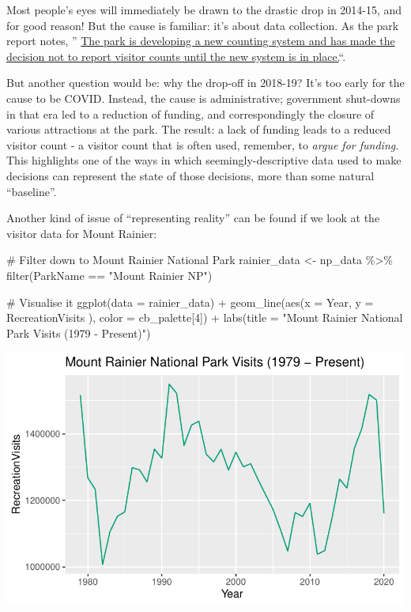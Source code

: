 \documentclass[
  letterpaper,
  DIV=11,
  numbers=noendperiod]{scrartcl}
\newenvironment{Shaded}{\begin{snugshade}}{\end{snugshade}}
\newcommand{\AttributeTok}[1]{\textcolor[rgb]{0.40,0.45,0.13}{#1}}
\newcommand{\CommentTok}[1]{\textcolor[rgb]{0.37,0.37,0.37}{#1}}
\newcommand{\DecValTok}[1]{\textcolor[rgb]{0.68,0.00,0.00}{#1}}
\newcommand{\FunctionTok}[1]{\textcolor[rgb]{0.28,0.35,0.67}{#1}}
\newcommand{\NormalTok}[1]{\textcolor[rgb]{0.00,0.23,0.31}{#1}}
\newcommand{\OtherTok}[1]{\textcolor[rgb]{0.00,0.23,0.31}{#1}}
\newcommand{\SpecialCharTok}[1]{\textcolor[rgb]{0.37,0.37,0.37}{#1}}
\newcommand{\StringTok}[1]{\textcolor[rgb]{0.13,0.47,0.30}{#1}}
\begin{document}
Most people's eyes will immediately be drawn to the drastic drop in
2014-15, and for good reason! But the cause is familiar: it's about data
collection. As the park report notes, ''
\href{https://irma.nps.gov/Stats/SSRSReports/Park\%20Specific\%20Reports/Monthly\%20Visitation\%20Comments\%20By\%20Park?Park=MORA}{The
park is developing a new counting system and has made the decision not
to report visitor counts until the new system is in place.}``.

But another question would be: why the drop-off in 2018-19? It's too
early for the cause to be COVID. Instead, the cause is administrative;
government shut-downs in that era led to a reduction of funding, and
correspondingly the closure of various attractions at the park. The
result: a lack of funding leads to a reduced visitor count - a visitor
count that is often used, remember, to \emph{argue for funding}. This
highlights one of the ways in which seemingly-descriptive data used to
make decisions can represent the state of those decisions, more than
some natural ``baseline''.

Another kind of issue of ``representing reality'' can be found if we
look at the visitor data for Mount Rainier:

\begin{Shaded}
\begin{Highlighting}[]
\CommentTok{\# Filter down to Mount Rainier National Park}
\NormalTok{rainier\_data }\OtherTok{\textless{}{-}}\NormalTok{ np\_data }\SpecialCharTok{\%\textgreater{}\%} \FunctionTok{filter}\NormalTok{(ParkName }\SpecialCharTok{==} \StringTok{"Mount Rainier NP"}\NormalTok{)}

\CommentTok{\# Visualise it}
\FunctionTok{ggplot}\NormalTok{(}\AttributeTok{data =}\NormalTok{ rainier\_data) }\SpecialCharTok{+} 
  \FunctionTok{geom\_line}\NormalTok{(}\FunctionTok{aes}\NormalTok{(}\AttributeTok{x =}\NormalTok{ Year, }\AttributeTok{y =}\NormalTok{ RecreationVisits ), }\AttributeTok{color =}\NormalTok{ cb\_palette[}\DecValTok{4}\NormalTok{]) }\SpecialCharTok{+}
  \FunctionTok{labs}\NormalTok{(}\AttributeTok{title =} \StringTok{"Mount Rainier National Park Visits (1979 {-} Present)"}\NormalTok{)}
\end{Highlighting}
\end{Shaded}

\includegraphics{index_files/figure-pdf/unnamed-chunk-6-1.pdf}
\end{document}
